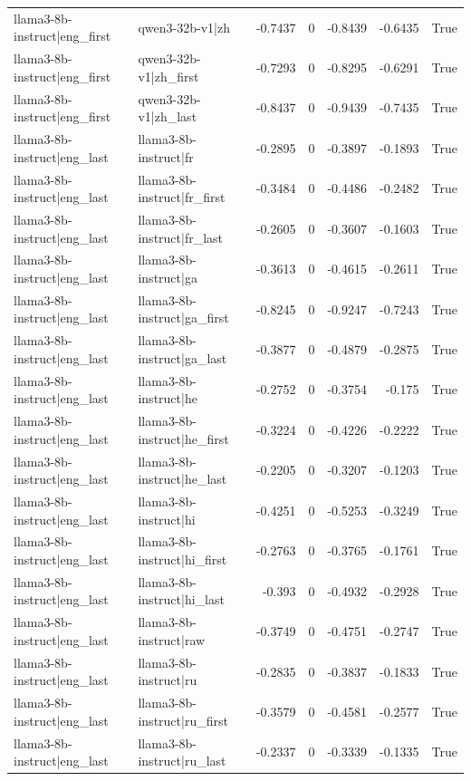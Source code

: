 \begin{table}
\begin{tabular}{l l r r r r l}
llama3-8b-instruct|eng_first & qwen3-32b-v1|zh & -0.7437 & 0 & -0.8439 & -0.6435 & True \\
llama3-8b-instruct|eng_first & qwen3-32b-v1|zh_first & -0.7293 & 0 & -0.8295 & -0.6291 & True \\
llama3-8b-instruct|eng_first & qwen3-32b-v1|zh_last & -0.8437 & 0 & -0.9439 & -0.7435 & True \\
llama3-8b-instruct|eng_last & llama3-8b-instruct|fr & -0.2895 & 0 & -0.3897 & -0.1893 & True \\
llama3-8b-instruct|eng_last & llama3-8b-instruct|fr_first & -0.3484 & 0 & -0.4486 & -0.2482 & True \\
llama3-8b-instruct|eng_last & llama3-8b-instruct|fr_last & -0.2605 & 0 & -0.3607 & -0.1603 & True \\
llama3-8b-instruct|eng_last & llama3-8b-instruct|ga & -0.3613 & 0 & -0.4615 & -0.2611 & True \\
llama3-8b-instruct|eng_last & llama3-8b-instruct|ga_first & -0.8245 & 0 & -0.9247 & -0.7243 & True \\
llama3-8b-instruct|eng_last & llama3-8b-instruct|ga_last & -0.3877 & 0 & -0.4879 & -0.2875 & True \\
llama3-8b-instruct|eng_last & llama3-8b-instruct|he & -0.2752 & 0 & -0.3754 & -0.175 & True \\
llama3-8b-instruct|eng_last & llama3-8b-instruct|he_first & -0.3224 & 0 & -0.4226 & -0.2222 & True \\
llama3-8b-instruct|eng_last & llama3-8b-instruct|he_last & -0.2205 & 0 & -0.3207 & -0.1203 & True \\
llama3-8b-instruct|eng_last & llama3-8b-instruct|hi & -0.4251 & 0 & -0.5253 & -0.3249 & True \\
llama3-8b-instruct|eng_last & llama3-8b-instruct|hi_first & -0.2763 & 0 & -0.3765 & -0.1761 & True \\
llama3-8b-instruct|eng_last & llama3-8b-instruct|hi_last & -0.393 & 0 & -0.4932 & -0.2928 & True \\
llama3-8b-instruct|eng_last & llama3-8b-instruct|raw & -0.3749 & 0 & -0.4751 & -0.2747 & True \\
llama3-8b-instruct|eng_last & llama3-8b-instruct|ru & -0.2835 & 0 & -0.3837 & -0.1833 & True \\
llama3-8b-instruct|eng_last & llama3-8b-instruct|ru_first & -0.3579 & 0 & -0.4581 & -0.2577 & True \\
llama3-8b-instruct|eng_last & llama3-8b-instruct|ru_last & -0.2337 & 0 & -0.3339 & -0.1335 & True \\

\end{tabular}
\end{table}
